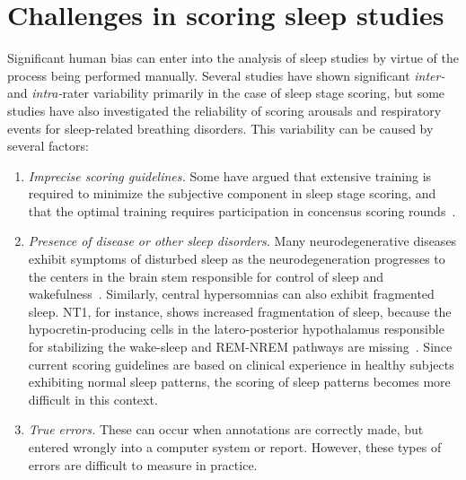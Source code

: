     \section{Challenges in scoring sleep studies}\label{sec:challenges-scoring-sleep-studies}
        Significant human bias can enter into the analysis of sleep studies by virtue of the process being performed manually.
        Several studies have shown significant \textit{inter-} and \textit{intra-}rater variability primarily in the case of sleep stage scoring, but some studies have also investigated the reliability of scoring arousals and respiratory events for sleep-related breathing disorders.
        This variability can be caused by several factors:
        \begin{enumerate}
            \item \textit{Imprecise scoring guidelines.}
            Some have argued that extensive training is required to minimize the subjective component in sleep stage scoring, and that the optimal training requires participation in concensus scoring rounds~\cite{Penzel2013}.
            \item \textit{Presence of disease or other sleep disorders.}
            Many neurodegenerative diseases exhibit symptoms of disturbed sleep as the neurodegeneration progresses to the centers in the brain stem responsible for control of sleep and wakefulness~\cite{Santamaria2011}.
            Similarly, central hypersomnias can also exhibit fragmented sleep.
            \ac{NT1}, for instance, shows increased fragmentation of sleep, because the hypocretin-producing cells in the latero-posterior hypothalamus responsible for stabilizing the wake-sleep and \ac{REM}-\ac{NREM} pathways are missing~\cite{Kornum2017}.
            Since current scoring guidelines are based on clinical experience in healthy subjects exhibiting normal sleep patterns, the scoring of sleep patterns becomes more difficult in this context.
            \item \textit{True errors.}
            These can occur when annotations are correctly made, but entered wrongly into a computer system or report. 
            However, these types of errors are difficult to measure in practice.
        \end{enumerate}
        
